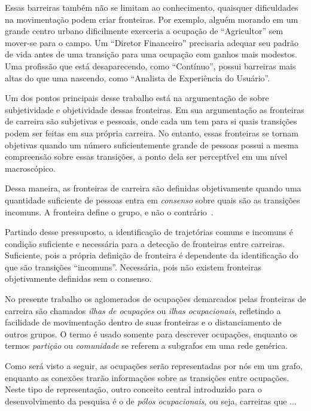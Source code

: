 \documentclass[
  article,
  11pt,
  a4paper,
  english,
  brazil,
  sumario=tradicional]{abntex2}
\begin{document}
Essas barreiras também não se limitam ao conhecimento, quaisquer dificuldades na movimentação podem criar fronteiras. Por exemplo, alguém morando em um grande centro urbano dificilmente exerceria a ocupação de \enquote{Agricultor} sem mover-se para o campo. Um \enquote{Diretor Financeiro} precisaria adequar seu padrão de vida antes de uma transição para uma ocupação com ganhos mais modestos. Uma profissão que está desaparecendo, como \enquote{Contínuo}, possui barreiras mais altas do que uma nascendo, como \enquote{Analista de Experiência do Usuário}.

Um dos pontos principais desse trabalho está na argumentação de  sobre subjetividade e objetividade dessas fronteiras. Em sua argumentação as fronteiras de carreira são subjetivas e pessoais, onde cada um tem para si quais transições podem ser feitas em sua própria carreira. No entanto, essas fronteiras se tornam objetivas quando um número suficientemente grande de pessoas possui a mesma compreensão sobre essas transições, a ponto dela ser perceptível em um nível macroscópico.

Dessa maneira, as fronteiras de carreira são definidas objetivamente quando uma quantidade suficiente de pessoas entra em \textit{consenso} sobre quais são as transições incomuns. A fronteira define o grupo, e não o contrário~\cite{Gunz2007-hr}.

Partindo desse pressuposto, a identificação de trajetórias comuns e incomuns é condição suficiente e necessária para a detecção de fronteiras entre carreiras. Suficiente, pois a própria definição de fronteira é dependente da identificação do que são transições \enquote{incomuns}. Necessária, pois não existem fronteiras objetivamente definidas sem o consenso.

No presente trabalho os aglomerados de ocupações demarcados pelas fronteiras de carreira são chamados \textit{ilhas de ocupações} ou \textit{ilhas ocupacionais}, refletindo a facilidade de movimentação dentro de suas fronteiras e o distanciamento de outros grupos. O termo é usado somente para descrever ocupações, enquanto os termos \textit{partição} ou \textit{comunidade} se referem a subgrafos em uma rede genérica.

Como será visto a seguir, as ocupações serão representadas por nós em um grafo, enquanto as conexões trarão informações sobre as transições entre ocupações. Neste tipo de representação, outro conceito central introduzido para o desenvolvimento da pesquisa é o de \textit{pólos ocupacionais}, ou seja, carreiras que ...%
\end{document}

